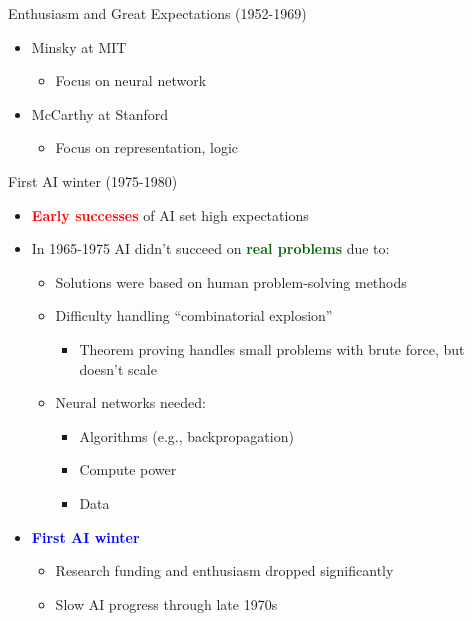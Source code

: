 \documentclass[
  10pt,
  ignorenonframetext,
]{beamer}
\providecommand{\tightlist}{%
  \setlength{\itemsep}{0pt}\setlength{\parskip}{0pt}}
\begin{document}
\begin{frame}{Enthusiasm and Great Expectations (1952-1969)}
\begin{itemize}
  \begin{itemize}
  \tightlist
  \item
    Minsky at MIT

    \begin{itemize}
    \tightlist
    \item
      Focus on neural network
    \end{itemize}
  \item
    McCarthy at Stanford

    \begin{itemize}
    \tightlist
    \item
      Focus on representation, logic
    \end{itemize}
  \end{itemize}
\end{itemize}
\end{frame}

\begin{frame}{First AI winter (1975-1980)}
\label{first-ai-winter-1975-1980}
\begin{itemize}
\item
  \textbf{\textcolor{red}{Early successes}} of AI set high expectations
\item
  In 1965-1975 AI didn't succeed on
  \textbf{\textcolor{darkgreen}{real problems}} due to:

  \begin{itemize}
  \tightlist
  \item
    Solutions were based on human problem-solving methods
  \item
    Difficulty handling ``combinatorial explosion''

    \begin{itemize}
    \tightlist
    \item
      Theorem proving handles small problems with brute force, but
      doesn't scale
    \end{itemize}
  \item
    Neural networks needed:

    \begin{itemize}
    \tightlist
    \item
      Algorithms (e.g., backpropagation)
    \item
      Compute power
    \item
      Data
    \end{itemize}
  \end{itemize}
\item
  \textbf{\textcolor{blue}{First AI winter}}

  \begin{itemize}
  \tightlist
  \item
    Research funding and enthusiasm dropped significantly
  \item
    Slow AI progress through late 1970s
  \end{itemize}
\end{itemize}
\end{frame}
\end{document}
